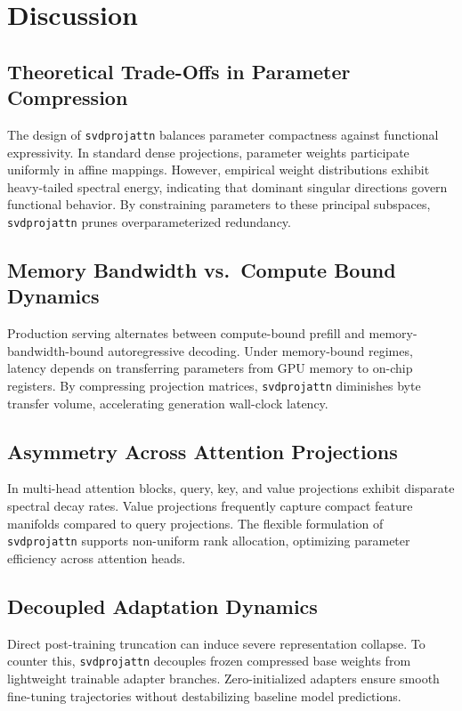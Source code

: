 \section{Discussion}

\subsection{Theoretical Trade-Offs in Parameter Compression}
The design of \texttt{svdprojattn} balances parameter compactness against functional expressivity. In standard dense projections, parameter weights participate uniformly in affine mappings. However, empirical weight distributions exhibit heavy-tailed spectral energy, indicating that dominant singular directions govern functional behavior. By constraining parameters to these principal subspaces, \texttt{svdprojattn} prunes overparameterized redundancy.

\subsection{Memory Bandwidth vs.\ Compute Bound Dynamics}
Production serving alternates between compute-bound prefill and memory-bandwidth-bound autoregressive decoding. Under memory-bound regimes, latency depends on transferring parameters from GPU memory to on-chip registers. By compressing projection matrices, \texttt{svdprojattn} diminishes byte transfer volume, accelerating generation wall-clock latency.

\subsection{Asymmetry Across Attention Projections}
In multi-head attention blocks, query, key, and value projections exhibit disparate spectral decay rates. Value projections frequently capture compact feature manifolds compared to query projections. The flexible formulation of \texttt{svdprojattn} supports non-uniform rank allocation, optimizing parameter efficiency across attention heads.

\subsection{Decoupled Adaptation Dynamics}
Direct post-training truncation can induce severe representation collapse. To counter this, \texttt{svdprojattn} decouples frozen compressed base weights from lightweight trainable adapter branches. Zero-initialized adapters ensure smooth fine-tuning trajectories without destabilizing baseline model predictions.

